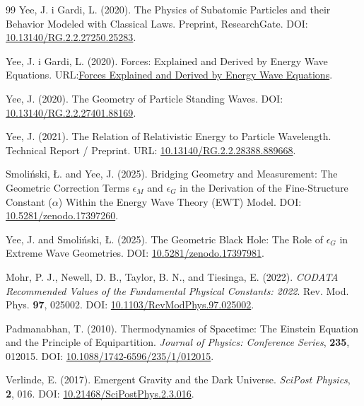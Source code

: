\documentclass[10pt,a4paper]{article}
\begin{document}
\begin{thebibliography}{99}
	Yee, J. i Gardi, L. (2020).
	The Physics of Subatomic Particles and their Behavior Modeled with Classical Laws.
	Preprint, ResearchGate.
	DOI: \href{https://doi.org/10.13140/RG.2.2.27250.25283}{10.13140/RG.2.2.27250.25283}.
	
	Yee, J. i Gardi, L. (2020).
	Forces: Explained and Derived by Energy Wave Equations.
	URL:\href{https://www.academia.edu/33168033/Forces_Explained_and_Derived_by_Energy_Wave_Equations}{Forces Explained and Derived by Energy Wave Equations}.
	
	
	Yee, J. (2020).
	The Geometry of Particle Standing Waves.
	DOI: \href{https://doi.org/10.13140/RG.2.2.27401.88169}{10.13140/RG.2.2.27401.88169}.
	
	Yee, J. (2021).
	The Relation of Relativistic Energy to Particle Wavelength.
	Technical Report / Preprint.
	URL: \href{https://doi.org/10.13140/RG.2.2.28388.88966}{10.13140/RG.2.2.28388.889668}.
	
	Smoliński, Ł. and Yee, J. (2025).
	Bridging Geometry and Measurement: The Geometric Correction Terms $\epsilon_{M}$ and $\epsilon_{G}$ in the Derivation of the Fine-Structure Constant ($\alpha$) Within the Energy Wave Theory (EWT) Model.
	DOI: \href{https://doi.org/10.5281/zenodo.17397260}{10.5281/zenodo.17397260}.
	
	Yee, J. and Smoliński, Ł. (2025).
	The Geometric Black Hole: The Role of $\epsilon_{G}$ in Extreme Wave Geometries.
	DOI: \href{https://doi.org/10.5281/zenodo.17397981}{10.5281/zenodo.17397981}.
	
	Mohr, P. J., Newell, D. B., Taylor, B. N., and Tiesinga, E. (2022).
	\textit{CODATA Recommended Values of the Fundamental Physical Constants: 2022}.
	Rev. Mod. Phys. \textbf{97}, 025002.
	DOI: \href{https://doi.org/10.1103/RevModPhys.97.025002}{10.1103/RevModPhys.97.025002}.
	
	Padmanabhan, T. (2010).
	Thermodynamics of Spacetime: The Einstein Equation and the Principle of Equipartition.
	\textit{Journal of Physics: Conference Series}, \textbf{235}, 012015.
	DOI: \href{https://doi.org/10.1088/1742-6596/235/1/012015}{10.1088/1742-6596/235/1/012015}.
	
	Verlinde, E. (2017).
	Emergent Gravity and the Dark Universe.
	\textit{SciPost Physics}, \textbf{2}, 016.
	DOI: \href{https://doi.org/10.21468/SciPostPhys.2.3.016}{10.21468/SciPostPhys.2.3.016}.
		

\end{thebibliography}
\end{document}
